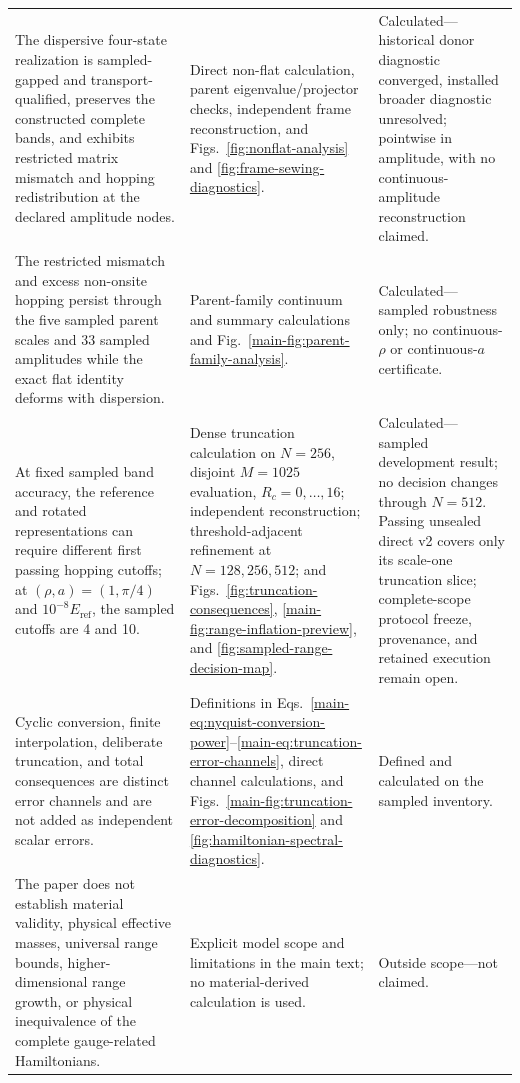 \documentclass[11pt]{article}
\begin{document}
\begin{longtable}{@{}>{\raggedright\arraybackslash}p{}>{\raggedright\arraybackslash}p{}>{\raggedright\arraybackslash}p{}@{}}
The dispersive four-state realization is sampled-gapped and transport-qualified, preserves the constructed complete bands, and exhibits restricted matrix mismatch and hopping redistribution at the declared amplitude nodes. & Direct non-flat calculation, parent eigenvalue/projector checks, independent frame reconstruction, and Figs.~\ref{fig:nonflat-analysis} and \ref{fig:frame-sewing-diagnostics}. & Calculated---historical donor diagnostic converged, installed broader diagnostic unresolved; pointwise in amplitude, with no continuous-amplitude reconstruction claimed.\\
The restricted mismatch and excess non-onsite hopping persist through the five sampled parent scales and 33 sampled amplitudes while the exact flat identity deforms with dispersion. & Parent-family continuum and summary calculations and Fig.~\ref{main-fig:parent-family-analysis}. & Calculated---sampled robustness only; no continuous-$\rho$ or continuous-$a$ certificate.\\
At fixed sampled band accuracy, the reference and rotated representations can require different first passing hopping cutoffs; at $(\rho,a)=(1,\pi/4)$ and $10^{-8}E_{\mathrm{ref}}$, the sampled cutoffs are 4 and 10. & Dense truncation calculation on $N=256$, disjoint $M=1025$ evaluation, $R_c=0,\ldots,16$; independent reconstruction; threshold-adjacent refinement at $N=128,256,512$; and Figs.~\ref{fig:truncation-consequences}, \ref{main-fig:range-inflation-preview}, and \ref{fig:sampled-range-decision-map}. & Calculated---sampled development result; no decision changes through $N=512$. Passing unsealed direct v2 covers only its scale-one truncation slice; complete-scope protocol freeze, provenance, and retained execution remain open.\\
Cyclic conversion, finite interpolation, deliberate truncation, and total consequences are distinct error channels and are not added as independent scalar errors. & Definitions in Eqs.~\eqref{main-eq:nyquist-conversion-power}--\eqref{main-eq:truncation-error-channels}, direct channel calculations, and Figs.~\ref{main-fig:truncation-error-decomposition} and \ref{fig:hamiltonian-spectral-diagnostics}. & Defined and calculated on the sampled inventory.\\
The paper does not establish material validity, physical effective masses, universal range bounds, higher-dimensional range growth, or physical inequivalence of the complete gauge-related Hamiltonians. & Explicit model scope and limitations in the main text; no material-derived calculation is used. & Outside scope---not claimed.\\
\bottomrule
\end{longtable}
\normalsize
\end{document}
